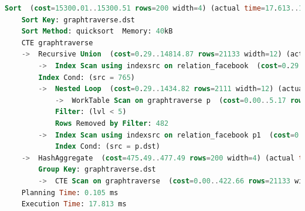 \begin{lstlisting}[language=SQL,caption = Ausführungsplan Standard SQL,frame=single, label={AusführungsplanCTEFacebook} ]
    Sort  (cost=15300.01..15300.51 rows=200 width=4) (actual time=17.613..17.622 rows=321 loops=1)
    Sort Key: graphtraverse.dst
    Sort Method: quicksort  Memory: 40kB
    CTE graphtraverse
    ->  Recursive Union  (cost=0.29..14814.87 rows=21133 width=12) (actual time=0.016..15.903 rows=6056 loops=1)
        ->  Index Scan using indexsrc on relation_facebook  (cost=0.29..44.00 rows=23 width=12) (actual time=0.015..0.020 rows=27 loops=1)
        Index Cond: (src = 765)
        ->  Nested Loop  (cost=0.29..1434.82 rows=2111 width=12) (actual time=0.019..2.130 rows=8173 loops=5)
            ->  WorkTable Scan on graphtraverse p  (cost=0.00..5.17 rows=77 width=8) (actual time=0.017..0.069 rows=729 loops=5)
            Filter: (lvl < 5)
            Rows Removed by Filter: 482
        ->  Index Scan using indexsrc on relation_facebook p1  (cost=0.29..18.23 rows=27 width=8) (actual time=0.001..0.002 rows=11 loops=3645)
            Index Cond: (src = p.dst)
    ->  HashAggregate  (cost=475.49..477.49 rows=200 width=4) (actual time=17.548..17.571 rows=321 loops=1)
        Group Key: graphtraverse.dst
        ->  CTE Scan on graphtraverse  (cost=0.00..422.66 rows=21133 width=4) (actual time=0.017..16.771 rows=6056 loops=1)
    Planning Time: 0.105 ms
    Execution Time: 17.813 ms
\end{lstlisting}

